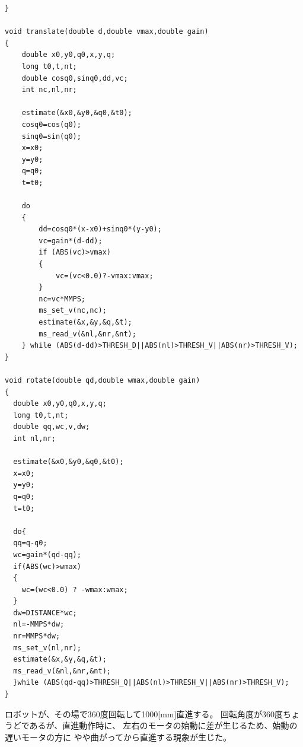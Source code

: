 \begin{lstlisting}[caption=演習18のプログラム,label=s18]
}

void translate(double d,double vmax,double gain)
{
    double x0,y0,q0,x,y,q;
    long t0,t,nt;
    double cosq0,sinq0,dd,vc;
    int nc,nl,nr;

    estimate(&x0,&y0,&q0,&t0);
    cosq0=cos(q0);
    sinq0=sin(q0);
    x=x0;
    y=y0;
    q=q0;
    t=t0;

    do
    {
        dd=cosq0*(x-x0)+sinq0*(y-y0);
        vc=gain*(d-dd);
        if (ABS(vc)>vmax)
        {
            vc=(vc<0.0)?-vmax:vmax;
        }
        nc=vc*MMPS;
        ms_set_v(nc,nc);
        estimate(&x,&y,&q,&t);
        ms_read_v(&nl,&nr,&nt);
    } while (ABS(d-dd)>THRESH_D||ABS(nl)>THRESH_V||ABS(nr)>THRESH_V);
}

void rotate(double qd,double wmax,double gain)
{
  double x0,y0,q0,x,y,q;
  long t0,t,nt;
  double qq,wc,v,dw;
  int nl,nr;

  estimate(&x0,&y0,&q0,&t0);
  x=x0;
  y=y0;
  q=q0;
  t=t0;

  do{
  qq=q-q0;
  wc=gain*(qd-qq);
  if(ABS(wc)>wmax)
  {
    wc=(wc<0.0) ? -wmax:wmax;
  }
  dw=DISTANCE*wc;
  nl=-MMPS*dw;
  nr=MMPS*dw;
  ms_set_v(nl,nr);
  estimate(&x,&y,&q,&t);
  ms_read_v(&nl,&nr,&nt);
  }while (ABS(qd-qq)>THRESH_Q||ABS(nl)>THRESH_V||ABS(nr)>THRESH_V);
}
\end{lstlisting}

ロボットが、その場で360度回転して1000[mm]直進する。
回転角度が360度ちょうどであるが、直進動作時に、
左右のモータの始動に差が生じるため、始動の遅いモータの方に
やや曲がってから直進する現象が生じた。